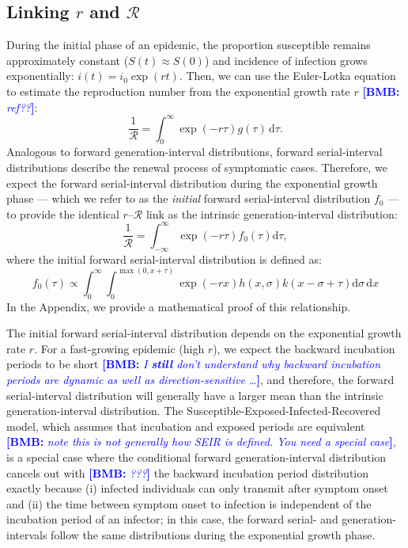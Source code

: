 \documentclass[12pt]{article}
\newcommand{\comment}{\showcomment}
\newcommand{\showcomment}[3]{\textcolor{#1}{\textbf{[#2: }\textsl{#3}\textbf{]}}}
\newcommand{\bmb}[1]{\comment{blue}{BMB}{#1}}
\newcommand{\RR}{\ensuremath{{\mathcal R}}\xspace}
\newcommand{\dd}[1]{\ensuremath{\, \mathrm{d}#1}}
\newcommand{\dtau}{\dd{\tau}}
\begin{document}
\subsection{Linking $r$ and \RR}

During the initial phase of an epidemic, the proportion susceptible remains approximately constant ($S(t) \approx S(0)$) and incidence of infection grows exponentially: $i(t)=i_0\exp(rt)$.
Then, we can use the Euler-Lotka equation to estimate the reproduction number from the exponential growth rate $r$ \bmb{ref??}:
\begin{equation}
\frac{1}{\RR} = \int_0^\infty \exp(-r\tau) g(\tau) \dtau.
\end{equation}
Analogous to forward generation-interval distributions, 
forward serial-interval distributions describe the renewal process of symptomatic cases.
Therefore, we expect the forward serial-interval distribution during the exponential growth phase --- which we refer to as the \emph{initial} forward serial-interval distribution $f_0$ --- to provide the identical $r$--\RR link as the intrinsic generation-interval distribution:
\begin{equation}
\frac{1}{\RR} = \int_{-\infty}^\infty \exp(-r\tau) f_{0}(\tau) \mathrm{d} \tau,
\end{equation}
where the initial forward serial-interval distribution is defined as:
\begin{equation}
f_{0}(\tau) \propto \int_{0}^{\infty} \int_{0}^{\max(0,x+\tau)} \exp(-rx) h(x, \sigma) k(x-\sigma+\tau) \mathrm{d}\sigma\,\mathrm{d}x
\end{equation}
In the Appendix, we provide a mathematical proof of this relationship.

The initial forward serial-interval distribution depends on the exponential growth rate $r$.
For a fast-growing epidemic (high $r$), we expect the backward incubation periods to be short \bmb{I \textbf{still} don't understand why backward incubation periods are dynamic as well as direction-sensitive \ldots}, and therefore, the forward serial-interval distribution will generally have a larger mean than the intrinsic generation-interval distribution.
The Susceptible-Exposed-Infected-Recovered model, which assumes that incubation and exposed periods are equivalent \bmb{note this is not generally how SEIR is defined. You need a special case}, is a special case where the conditional forward generation-interval distribution cancels out with \bmb{???} the backward incubation period distribution exactly because (i) infected individuals can only transmit after symptom onset and (ii) the time between symptom onset to infection is independent of the incubation period of an infector;
in this case, the forward serial- and generation-intervals follow the same distributions during the exponential growth phase.
\end{document}

